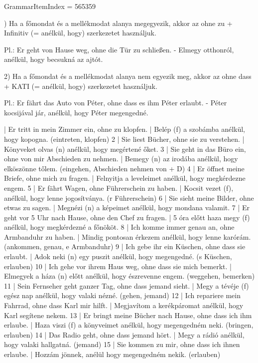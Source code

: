 \documentclass{article}
\newenvironment{desc}{\verbatim}{\endverbatim}
\newenvironment{exmp}{\verbatim}{\endverbatim}
\begin{document}
GrammarItemIndex = 565359

\begin{desc}
1) Ha a főmondat és a mellékmodat alanya megegyezik, akkor az ohne zu + Infinitiv (= anélkül, hogy) szerkezetet használjuk.

Pl.: Er geht von Hause weg, ohne die Tür zu schließen. - Elmegy otthonról, anélkül, hogy becsukná az ajtót.

2) Ha a főmondat és a mellékmodat alanya nem egyezik meg, akkor az ohne dass + KATI (= anélkül, hogy) szerkezetet használjuk.

Pl.: Er fährt das Auto von Péter, ohne dass es ihm Péter erlaubt. - Péter kocsijával jár, anélkül, hogy Péter megengedné.
\end{desc}

\begin{exmp}
1 | Er tritt in mein Zimmer ein, ohne zu klopfen. | Belép (f) a szobámba anélkül, hogy kopogna. (eintreten, klopfen)
2 | Sie liest Bücher, ohne sie zu verstehen. | Könyveket olvas (n) anélkül, hogy megértené őket.
3 | Sie geht in das Büro ein, ohne von mir Abschieden zu nehmen. | Bemegy (n) az irodába anélkül, hogy elköszönne tőlem. (eingehen, Abschieden nehmen von + D)
4 | Er öffnet meine Briefe, ohne mich zu fragen. | Felnyitja a leveleimet anélkül, hogy megkérdezne engem.
5 | Er fährt Wagen, ohne Führerschein zu haben. | Kocsit vezet (f), anélkül, hogy lenne jogosítványa. (r Führerschein)
6 | Sie sieht meine Bilder, ohne etwas zu sagen. | Megnézi (n) a képeimet anélkül, hogy mondana valamit.
7 | Er geht vor 5 Uhr nach Hause, ohne den Chef zu fragen. | 5 óra előtt haza megy (f) anélkül, hogy megkérdezné a főnököt.
8 | Ich komme immer genau an, ohne Armbanduhr zu haben. | Mindig pontosan érkezem anélkül, hogy lenne karórám. (ankommen, genau, e Armbanduhr)
9 | Ich gebe ihr ein Küschen, ohne dass sie erlaubt. | Adok neki (n) egy puszit anélkül, hogy megengedné. (s Küschen, erlauben)
10 | Ich gehe vor ihrem Haus weg, ohne dass sie mich bemerkt. | Elmegyek a háza (n) előtt anélkül, hogy észrevenne engem. (weggehen, bemerken)
11 | Sein Fernseher geht ganzer Tag, ohne dass jemand sieht. | Megy a tévéje (f) egész nap anélkül, hogy valaki nézné. (gehen, jemand)
12 | Ich repariere mein Fahrrad, ohne dass Karl mir hilft. | Megjavítom a kerékpáromat anélkül, hogy Karl segítene nekem.
13 | Er bringt meine Bücher nach Hause, ohne dass ich ihm erlaube. | Haza viszi (f) a könyveimet anélkül, hogy megengedném neki. (bringen, erlauben)
14 | Das Radio geht, ohne dass jemand hört. | Megy a rádió anélkül, hogy valaki hallgatná. (jemand)
15 | Sie kommen zu mir, ohne dass ich ihnen erlaube. | Hozzám jönnek, anélül hogy megengedném nekik. (erlauben)
\end{exmp}
\end{document}
